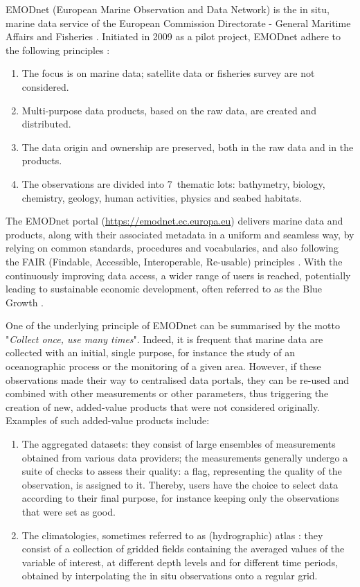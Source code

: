 \documentclass[essd, manuscript]{copernicus}
\begin{document}
\introduction 

EMODnet (European Marine Observation and Data Network) is the in situ, marine data service of the European Commission Directorate - General Maritime Affairs and Fisheries \citep{MartinMiguez2019}. Initiated in 2009 as a pilot project, EMODnet adhere to the following principles \citep{Shepherd2018}: 
\begin{enumerate}
\item The focus is on marine data; satellite data or fisheries survey are not considered. 
\item Multi-purpose data products, based on the raw data, are created and distributed. 
\item The data origin and ownership are preserved, both in the raw data and in the products. 
\item The observations are divided into 7~thematic lots: bathymetry, biology, chemistry, geology, human activities, physics and seabed habitats. 
\end{enumerate} 

The EMODnet portal (\url{https://emodnet.ec.europa.eu}) delivers marine data and products, along with their associated metadata in a uniform and seamless way, by relying on common standards, procedures and vocabularies, and also following the FAIR (Findable, Accessible, Interoperable, Re-usable) principles \citep {Wilkinson2016,Wilkinson2019}. With the continuously improving data access, a wider range of users is reached, potentially leading to sustainable economic development, often referred to as the Blue Growth \citep{Commission2012}. 

One of the underlying principle of EMODnet can be summarised by the motto "\textit{Collect once, use many times}". Indeed, it is frequent that marine data are collected with an initial, single purpose, for instance the study of an oceanographic process or the monitoring of a given area. However, if these observations made their way to centralised data portals, they can be re-used and combined with other measurements or other parameters, thus triggering the creation of new, added-value products that were not considered originally. Examples of such added-value products include:
\begin{enumerate}
\item The aggregated datasets: they consist of large ensembles of measurements obtained from various data providers; the measurements generally undergo a suite of checks to assess their quality: a flag, representing the quality of the observation, is assigned to it. Thereby, users have the choice to select data according to their final purpose, for instance keeping only the observations that were set as good.
\item The climatologies, sometimes referred to as (hydrographic) atlas \citep[e.g.][]{soton16209,Iona_2018}: they consist of a collection of gridded fields containing the averaged values of the variable of interest, at different depth levels and for different time periods, obtained by interpolating the in situ observations onto a regular grid.
\end{enumerate}
\end{document}
